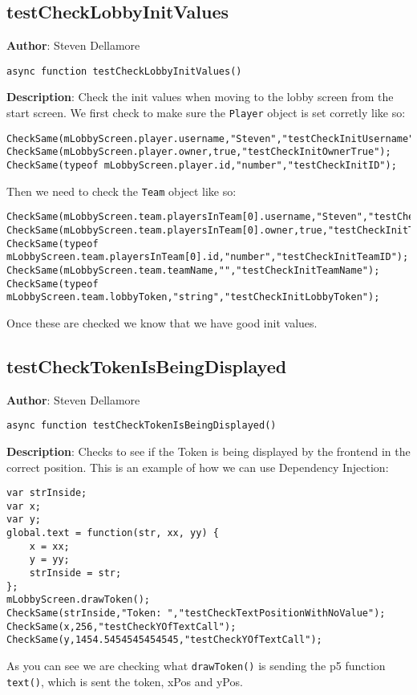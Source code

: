 \documentclass[12pt]{article}
\begin{document}
\subsection{testCheckLobbyInitValues}
\textbf{Author}: Steven Dellamore 
\vspace*{1\baselineskip}
\begin{lstlisting}
async function testCheckLobbyInitValues()
\end{lstlisting} 
\vspace*{1\baselineskip}
\textbf{Description}: Check the init values when moving to the lobby screen from the start screen. We first check to make sure the \texttt{Player} object is set corretly like so: 
\begin{verbatim}
CheckSame(mLobbyScreen.player.username,"Steven","testCheckInitUsername");
CheckSame(mLobbyScreen.player.owner,true,"testCheckInitOwnerTrue");
CheckSame(typeof mLobbyScreen.player.id,"number","testCheckInitID");
\end{verbatim}
 Then we need to check the \texttt{Team} object like so: 
\begin{verbatim}
CheckSame(mLobbyScreen.team.playersInTeam[0].username,"Steven","testCheckInitTeamUsername");
CheckSame(mLobbyScreen.team.playersInTeam[0].owner,true,"testCheckInitTeamOwnerTrue");
CheckSame(typeof mLobbyScreen.team.playersInTeam[0].id,"number","testCheckInitTeamID");
CheckSame(mLobbyScreen.team.teamName,"","testCheckInitTeamName");
CheckSame(typeof mLobbyScreen.team.lobbyToken,"string","testCheckInitLobbyToken");
\end{verbatim}
 Once these are checked we know that we have good init values. 



\subsection{testCheckTokenIsBeingDisplayed}
\textbf{Author}: Steven Dellamore 
\vspace*{1\baselineskip}
\begin{lstlisting}
async function testCheckTokenIsBeingDisplayed()
\end{lstlisting} 
\vspace*{1\baselineskip}
\textbf{Description}: Checks to see if the Token is being displayed by the frontend in the correct position. This is an example of how we can use Dependency Injection: 
\begin{verbatim}
var strInside;
var x;
var y;
global.text = function(str, xx, yy) {
    x = xx;
    y = yy;
    strInside = str;
};
mLobbyScreen.drawToken();
CheckSame(strInside,"Token: ","testCheckTextPositionWithNoValue");
CheckSame(x,256,"testCheckYOfTextCall");
CheckSame(y,1454.5454545454545,"testCheckYOfTextCall");
\end{verbatim}
 As you can see we are checking what \texttt{drawToken()} is sending the p5 function \texttt{text()}, which is sent the token, xPos and yPos. 
\end{document}
